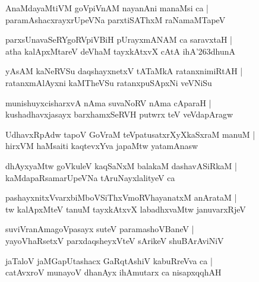 \documentclass[twoside,12pt,openright]{book}
\def\S{\char'263}
\newcounter{shloka}[chapter]
\begin{document}
\begin{shloka}%
AnaMdayaMtiVM goVpiVnAM nayanAni manaMsi ca |\\
paramAshacxrayxrUpeVNa parxtiSAThxM raNamaMTapeV 
\end{shloka}

\begin{shloka}%
parxsUnavaSeRYgoRVpiVBiH pUrayxmANAM ca saravxtaH |\\
atha kalApxMtareV deVhaM tayxkAtxvX cAtA ihA\S dhunA 
\end{shloka}

\begin{shloka}%
yAsAM kaNeRVSu daqshayxnetxV tATaMkA ratanxnimiRtAH |\\
ratanxmAlAyxni kaMTheVSu ratanxpuSApxNi veVNiSu
\end{shloka}

\begin{shloka}%
munishuyxcisharxvA nAma suvaNoRV nAma cAparaH |\\
kushadhavxjasayx barxhamxSeRVH putwrx teV veVdapAragw
\end{shloka}

\begin{shloka}%
UdhavxRpAdw tapoV GoVraM teVpatusatxrXyXkaSxraM manuM |\\
hirxVM haMsaiti kaqtevxYva japaMtw yatamAnasw
\end{shloka}

\begin{shloka}%
dhAyxyaMtw goVkuleV kaqSaNxM balakaM dashavASiRkaM |\\
kaMdapaRsamarUpeVNa tAruNayxlalityeV ca 
\end{shloka}

\begin{shloka}%
pashayxnitxVvarxbiMboVSiThxVmoRVhayanatxM anArataM |\\
tw kalApxMteV tanuM tayxkAtxvX labadhxvaMtw januvarxRjeV 
\end{shloka}

\begin{shloka}%
suviVranAmagoVpasayx suteV paramashoVBaneV |\\
yayoVhaRsetxV parxdaqsheyxVteV sArikeV shuBArAviNiV 
\end{shloka}

\begin{shloka}%
jaTaloV jaMGapUtashacx GaRqtAshiV kabuRreVva ca |\\
catAvxroV munayoV dhanAyx ihAmutarx ca nisapxqqhAH 
\end{shloka}
\end{document}
